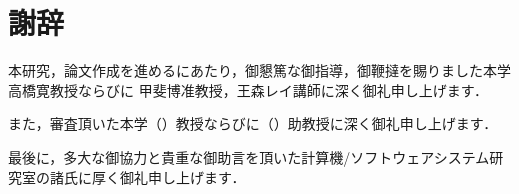 \documentclass[11pt,a4j]{jreport}
\begin{document}
\chapter*{謝辞} %
本研究，論文作成を進めるにあたり，御懇篤な御指導，御鞭撻を賜りました本学高橋寛教授ならびに
甲斐博准教授，王森レイ講師に深く御礼申し上げます．

また，審査頂いた本学（）教授ならびに（）助教授に深く御礼申し上げます．

最後に，多大な御協力と貴重な御助言を頂いた計算機/ソフトウェアシステム研究室の諸氏に厚く御礼申し上げます．
\renewcommand{\bibname}{参考文献} %
\end{document}
